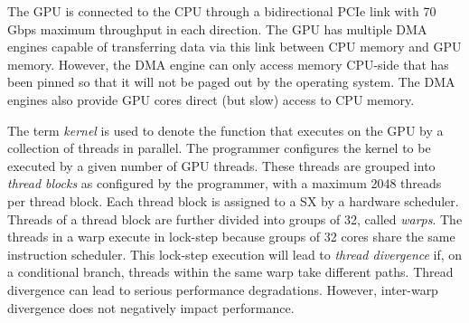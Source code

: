 The GPU is connected to the CPU through a bidirectional PCIe link with 70 Gbps maximum throughput in each direction. 
The GPU has multiple DMA engines capable of
transferring data via this link between CPU memory and GPU memory. 
However, the DMA engine can only access memory CPU-side that has been pinned so that
it will not be paged out by the operating system.
The DMA engines also provide GPU cores direct (but slow) access to CPU memory.

The term \emph{kernel} is used to denote the function that executes on the 
GPU by a collection of threads in parallel.
The programmer configures the kernel to be executed by a given number of GPU threads.
These threads are grouped into {\it thread blocks} as configured by the programmer, with a maximum 2048 threads per thread block.
Each thread block is assigned to a SX by a hardware scheduler. 
Threads of a thread block are further divided into groups of 32, called \emph{warps}. 
The threads in a warp execute in lock-step 
because groups of 32 cores share the same instruction scheduler.
This lock-step execution will lead to {\it thread divergence} if,
on a conditional branch, threads within the same warp take different paths.
Thread divergence can lead to serious performance degradations. 
However, inter-warp divergence does not negatively impact performance.


